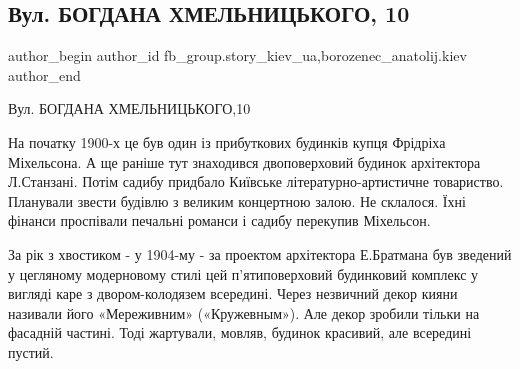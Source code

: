  
 
 
 
 
 
\subsection{Вул. БОГДАНА ХМЕЛЬНИЦЬКОГО, 10}
\label{sec:30_01_2022.fb.fb_group.story_kiev_ua.1.ulica_bogdana_hmelnickogo_10}
 
\ifcmt
 author_begin
   author_id fb_group.story_kiev_ua,borozenec_anatolij.kiev
 author_end
\fi

Вул. БОГДАНА ХМЕЛЬНИЦЬКОГО,10

На початку 1900-х це був один із прибуткових будинків купця Фрідріха
Міхельсона. А ще раніше тут знаходився двоповерховий будинок архітектора
Л.Станзані. Потім садибу придбало Київське літературно-артистичне товариство.
Планували звести будівлю з великим концертною залою. Не склалося. Їхні фінанси
проспівали печальні романси і садибу перекупив Міхельсон.

\raggedcolumns
\begin{multicols}{2} %
\setlength{\parindent}{0pt}



\end{multicols} %

За рік з хвостиком - у 1904-му - за проектом архітектора Е.Братмана був
зведений у цегляному модерновому стилі цей п’ятиповерховий будинковий комплекс
у вигляді каре з двором-колодязем всередині. Через незвичний декор кияни
називали його «Мереживним» («Кружевным»). Але декор зробили тільки на фасадній
частині. Тоді жартували, мовляв, будинок красивий, але всередині пустий.

